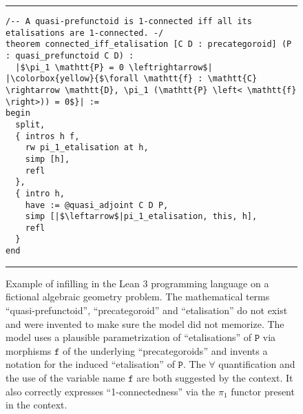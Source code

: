 \documentclass[10pt]{article}
\begin{document}
\begin{figure}[h!]
\small
\noindent\rule{\textwidth}{1pt}
\begin{verbatim}
/-- A quasi-prefunctoid is 1-connected iff all its etalisations are 1-connected. -/
theorem connected_iff_etalisation [C D : precategoroid] (P : quasi_prefunctoid C D) :
  |$\pi_1 \mathtt{P} = 0 \leftrightarrow$|  |\colorbox{yellow}{$\forall \mathtt{f} : \mathtt{C} \rightarrow \mathtt{D}, \pi_1 (\mathtt{P} \left< \mathtt{f} \right>)) = 0$}| :=
begin
  split,
  { intros h f,
    rw pi_1_etalisation at h,
    simp [h],
    refl
  },
  { intro h,
    have := @quasi_adjoint C D P,
    simp [|$\leftarrow$|pi_1_etalisation, this, h],
    refl
  }
end
\end{verbatim}

\noindent\rule{\textwidth}{1pt}
\caption{Example of infilling in the Lean 3 programming language on a fictional algebraic geometry problem. The mathematical terms  ``quasi-prefunctoid'', ``precategoroid'' and ``etalisation'' do not exist and were invented to make sure the model did not memorize. The model uses a plausible parametrization of ``etalisations'' of $\mathtt{P}$ via morphisms $\mathtt{f}$ of the underlying ``precategoroids'' and invents a notation for the induced ``etalisation'' of $\mathtt{P}$. The $\forall$ quantification and the use of the variable name $\mathtt{f}$ are both suggested by the context. It also correctly expresses ``1-connectedness'' via the $\pi_1$ functor present in the context.\label{fig:leanexample}}
\end{figure}
\end{document}
